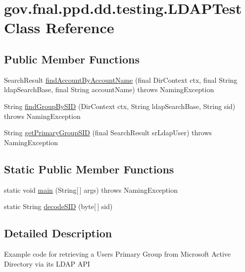 \hypertarget{classgov_1_1fnal_1_1ppd_1_1dd_1_1testing_1_1LDAPTest}{\section{gov.\-fnal.\-ppd.\-dd.\-testing.\-L\-D\-A\-P\-Test Class Reference}
\label{classgov_1_1fnal_1_1ppd_1_1dd_1_1testing_1_1LDAPTest}
}
\subsection*{Public Member Functions}
\begin{DoxyCompactItemize}
\item 
Search\-Result \hyperlink{classgov_1_1fnal_1_1ppd_1_1dd_1_1testing_1_1LDAPTest_a72851afc2559cdaedad0a8e8200286ee}{find\-Account\-By\-Account\-Name} (final Dir\-Context ctx, final String ldap\-Search\-Base, final String account\-Name)  throws Naming\-Exception 
\item 
String \hyperlink{classgov_1_1fnal_1_1ppd_1_1dd_1_1testing_1_1LDAPTest_a4193a418b921ed06928d0e742f00e143}{find\-Group\-By\-S\-I\-D} (Dir\-Context ctx, String ldap\-Search\-Base, String sid)  throws Naming\-Exception 
\item 
String \hyperlink{classgov_1_1fnal_1_1ppd_1_1dd_1_1testing_1_1LDAPTest_a15b4339fcdb2ba434f96fe8f977bda36}{get\-Primary\-Group\-S\-I\-D} (final Search\-Result sr\-Ldap\-User)  throws Naming\-Exception 
\end{DoxyCompactItemize}
\subsection*{Static Public Member Functions}
\begin{DoxyCompactItemize}
\item 
static void \hyperlink{classgov_1_1fnal_1_1ppd_1_1dd_1_1testing_1_1LDAPTest_a2179a073b7db97a09292e88590d881ce}{main} (String\mbox{[}$\,$\mbox{]} args)  throws Naming\-Exception 
\item 
static String \hyperlink{classgov_1_1fnal_1_1ppd_1_1dd_1_1testing_1_1LDAPTest_a655d095ec3f9653523ace37fe7f511ff}{decode\-S\-I\-D} (byte\mbox{[}$\,$\mbox{]} sid)
\end{DoxyCompactItemize}


\subsection{Detailed Description}
Example code for retrieving a Users Primary Group from Microsoft Active Directory via its L\-D\-A\-P A\-P\-I

